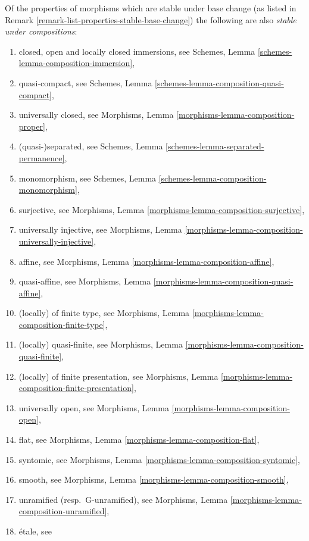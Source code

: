 \begin{remark}
\label{remark-list-properties-stable-composition}
Of the properties of morphisms which are stable under base change
(as listed in
Remark \ref{remark-list-properties-stable-base-change})
the following are also {\it stable under compositions}:
\begin{enumerate}
\item closed, open and locally closed immersions, see
Schemes, Lemma \ref{schemes-lemma-composition-immersion},
\item quasi-compact, see
Schemes, Lemma \ref{schemes-lemma-composition-quasi-compact},
\item universally closed, see
Morphisms, Lemma \ref{morphisms-lemma-composition-proper},
\item (quasi-)separated, see
Schemes, Lemma \ref{schemes-lemma-separated-permanence},
\item monomorphism, see
Schemes, Lemma \ref{schemes-lemma-composition-monomorphism},
\item surjective, see
Morphisms, Lemma \ref{morphisms-lemma-composition-surjective},
\item universally injective, see
Morphisms, Lemma \ref{morphisms-lemma-composition-universally-injective},
\item affine, see
Morphisms, Lemma \ref{morphisms-lemma-composition-affine},
\item quasi-affine, see
Morphisms, Lemma \ref{morphisms-lemma-composition-quasi-affine},
\item (locally) of finite type, see
Morphisms, Lemma \ref{morphisms-lemma-composition-finite-type},
\item (locally) quasi-finite, see
Morphisms, Lemma \ref{morphisms-lemma-composition-quasi-finite},
\item (locally) of finite presentation, see
Morphisms, Lemma \ref{morphisms-lemma-composition-finite-presentation},
\item universally open, see
Morphisms, Lemma \ref{morphisms-lemma-composition-open},
\item flat, see
Morphisms, Lemma \ref{morphisms-lemma-composition-flat},
\item syntomic, see
Morphisms, Lemma \ref{morphisms-lemma-composition-syntomic},
\item smooth, see
Morphisms, Lemma \ref{morphisms-lemma-composition-smooth},
\item unramified (resp.\ G-unramified), see
Morphisms, Lemma \ref{morphisms-lemma-composition-unramified},
\item \'etale, see

\end{enumerate}
\end{remark}
